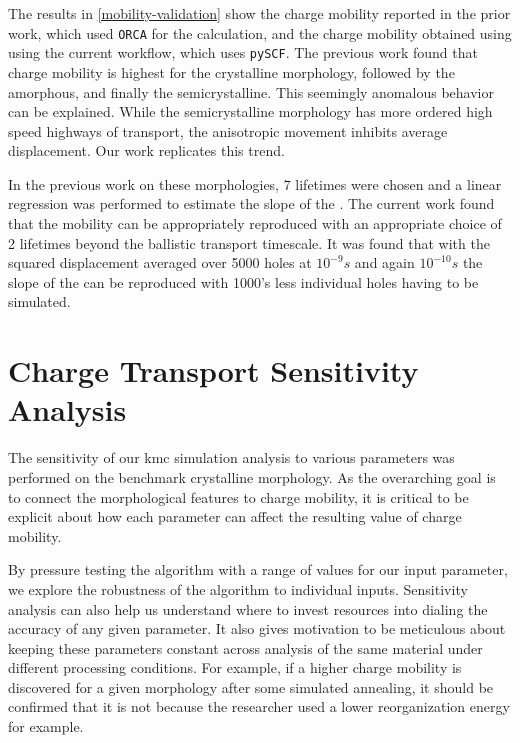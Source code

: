 The results in \ref{mobility-validation} show the charge mobility reported in the prior work, which used \texttt{ORCA} for
the  calculation, and the charge mobility obtained using using the current workflow, which uses \texttt{pySCF}. 
The previous work found that charge mobility is highest for the crystalline morphology, followed by the
amorphous, and finally the semicrystalline. This seemingly anomalous behavior can be explained. While the
semicrystalline morphology has more ordered high speed highways of transport, the anisotropic movement
inhibits average displacement. Our work replicates this trend.

In the previous work on these  morphologies, 7 lifetimes were chosen and a linear regression was performed
to estimate the slope of the . The current work found that the mobility can be appropriately reproduced
with an appropriate choice of 2 lifetimes beyond the ballistic transport timescale. It was found that with the 
squared displacement averaged over 5000 holes at $10^{-9}s$ and again $10^{-10}s$ the slope of the  can be reproduced with 1000's less individual holes having to be simulated.

\section{Charge Transport Sensitivity Analysis}

\label{sensitivity}

The sensitivity of our \gls{kmc} simulation analysis to various parameters was performed on the benchmark 
crystalline  morphology. As the overarching goal is to
connect the morphological features to charge mobility, it is critical to be
explicit about how each parameter can affect the resulting value of charge
mobility. 

By pressure testing the algorithm with a range of values for our input
parameter, we explore the robustness of the algorithm to individual inputs.
Sensitivity analysis can also help us understand where to
invest resources into dialing
the accuracy of any given parameter. It also gives motivation to be meticulous about keeping these parameters
constant across analysis of the same material under different processing conditions. For example, if a higher
charge mobility is discovered for a given morphology after some simulated annealing,
it should be confirmed that it is not because the researcher used a lower reorganization energy for example. 

